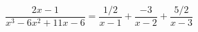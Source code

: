 \begin{example}
	\begin{equation*}
		\frac{2x-1}{x^3-6x^2+11x-6} = \frac{1/2}{x-1}+\frac{-3}{x-2}+\frac{5/2}{x-3}
	\end{equation*}
\end{example}